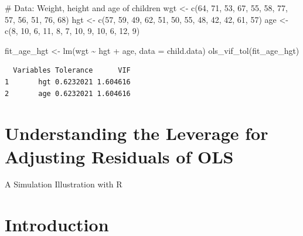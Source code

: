 \documentclass[
  letterpaper,
  DIV=11,
  numbers=noendperiod]{scrreprt}
\newenvironment{Shaded}{\begin{snugshade}}{\end{snugshade}}
\newcommand{\AttributeTok}[1]{\textcolor[rgb]{0.40,0.45,0.13}{#1}}
\newcommand{\CommentTok}[1]{\textcolor[rgb]{0.37,0.37,0.37}{#1}}
\newcommand{\DecValTok}[1]{\textcolor[rgb]{0.68,0.00,0.00}{#1}}
\newcommand{\FunctionTok}[1]{\textcolor[rgb]{0.28,0.35,0.67}{#1}}
\newcommand{\NormalTok}[1]{\textcolor[rgb]{0.00,0.23,0.31}{#1}}
\newcommand{\OtherTok}[1]{\textcolor[rgb]{0.00,0.23,0.31}{#1}}
\newcommand{\SpecialCharTok}[1]{\textcolor[rgb]{0.37,0.37,0.37}{#1}}
\begin{document}
\begin{Shaded}
\begin{Highlighting}[]
\CommentTok{\# Data: Weight, height and age of children}
\NormalTok{wgt }\OtherTok{\textless{}{-}} \FunctionTok{c}\NormalTok{(}\DecValTok{64}\NormalTok{, }\DecValTok{71}\NormalTok{, }\DecValTok{53}\NormalTok{, }\DecValTok{67}\NormalTok{, }\DecValTok{55}\NormalTok{, }\DecValTok{58}\NormalTok{, }\DecValTok{77}\NormalTok{, }\DecValTok{57}\NormalTok{, }\DecValTok{56}\NormalTok{, }\DecValTok{51}\NormalTok{, }\DecValTok{76}\NormalTok{, }\DecValTok{68}\NormalTok{)}
\NormalTok{hgt }\OtherTok{\textless{}{-}} \FunctionTok{c}\NormalTok{(}\DecValTok{57}\NormalTok{, }\DecValTok{59}\NormalTok{, }\DecValTok{49}\NormalTok{, }\DecValTok{62}\NormalTok{, }\DecValTok{51}\NormalTok{, }\DecValTok{50}\NormalTok{, }\DecValTok{55}\NormalTok{, }\DecValTok{48}\NormalTok{, }\DecValTok{42}\NormalTok{, }\DecValTok{42}\NormalTok{, }\DecValTok{61}\NormalTok{, }\DecValTok{57}\NormalTok{)}
\NormalTok{age }\OtherTok{\textless{}{-}} \FunctionTok{c}\NormalTok{(}\DecValTok{8}\NormalTok{, }\DecValTok{10}\NormalTok{, }\DecValTok{6}\NormalTok{, }\DecValTok{11}\NormalTok{, }\DecValTok{8}\NormalTok{, }\DecValTok{7}\NormalTok{, }\DecValTok{10}\NormalTok{, }\DecValTok{9}\NormalTok{, }\DecValTok{10}\NormalTok{, }\DecValTok{6}\NormalTok{, }\DecValTok{12}\NormalTok{, }\DecValTok{9}\NormalTok{)}

\NormalTok{fit\_age\_hgt }\OtherTok{\textless{}{-}} \FunctionTok{lm}\NormalTok{(wgt }\SpecialCharTok{\textasciitilde{}}\NormalTok{ hgt }\SpecialCharTok{+}\NormalTok{ age, }\AttributeTok{data =}\NormalTok{ child.data)}
\FunctionTok{ols\_vif\_tol}\NormalTok{(fit\_age\_hgt)}
\end{Highlighting}
\end{Shaded}

\begin{verbatim}
  Variables Tolerance      VIF
1       hgt 0.6232021 1.604616
2       age 0.6232021 1.604616
\end{verbatim}

\section{Understanding the Leverage for Adjusting Residuals of
OLS}\label{understanding-the-leverage-for-adjusting-residuals-of-ols}

A Simulation Illustration with R

\hfill\break

\section{Introduction}\label{introduction}
\end{document}

